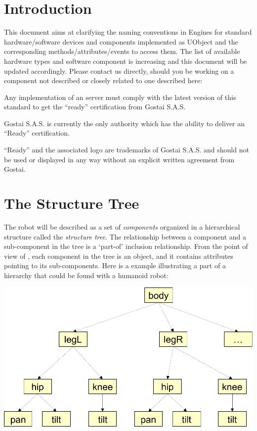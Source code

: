 \section{Introduction}

This document aims at clarifying the naming conventions
in \urbi Engines for standard hardware/software devices and components
implemented as UObject and the corresponding
methods/attributes/events to access them. The list of available
hardware types and software component is increasing and this document
will be updated accordingly. Please contact us directly, should you be
working on a component not described or closely related to one
described here:

\begin{center}
\end{center}

Any implementation of an \urbi server must comply with the latest version
of this standard to get the ``\urbi ready''
certification from Gostai S.A.S.


Gostai S.A.S. is currently the only authority which has the ability to
deliver an ``\urbi Ready'' certification.

``\urbi Ready'' and the associated logo are trademarks of Gostai
S.A.S. and should not be used or displayed in any way without an
explicit written agreement from Gostai.

\section{The Structure Tree}

The robot will be described as a set of
\textit{components} organized in a hierarchical
structure called the \textit{structure tree}. The
relationship between a component and a sub-component in the tree is a
‘part-of’ inclusion relationship. From the point of view of \urbi, each
component in the tree is an object, and it contains attributes pointing
to its sub-components. Here is a example illustrating a part of a
hierarchy that could be found with a humanoid robot:

\begin{center}
  \includegraphics[width=.8\linewidth]{img/structure-tree}
\end{center}

